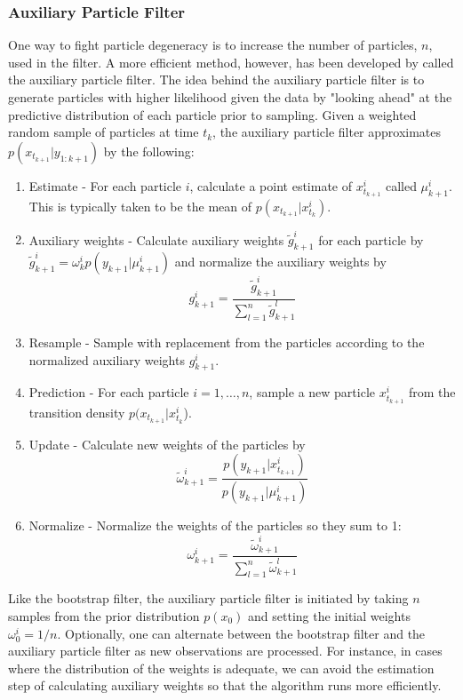 \documentclass{article}
\begin{document}
\subsubsection{Auxiliary Particle Filter}

One way to fight particle degeneracy is to increase the number of particles, $n$, used in the filter.  A more efficient method, however, has been developed by \citet{pitt} called the auxiliary particle filter.  The idea behind the auxiliary particle filter is to generate particles with higher likelihood given the data by "looking ahead" at the predictive distribution of each particle prior to sampling.  Given a weighted random sample of particles at time $t_k$, the auxiliary particle filter approximates $p(x_{t_{k+1}}|y_{1:k+1})$ by the following:

\begin{enumerate}
\item Estimate - For each particle $i$, calculate a point estimate of $x_{t_{k+1}}^i$ called $\mu_{k+1}^i$.  This is typically taken to be the mean of $p(x_{t_{k+1}}|x_{t_k}^i)$.
\item Auxiliary weights - Calculate auxiliary weights $\tilde{g}_{k+1}^i$ for each particle by $\tilde{g}_{k+1}^i = \omega_k^i p(y_{k+1}|\mu_{k+1}^i)$ and normalize the auxiliary weights by \[g_{k+1}^i = \frac{\tilde{g}_{k+1}^i}{\sum_{l=1}^n \tilde{g}_{k+1}^l}\]
\item Resample - Sample with replacement from the particles according to the normalized auxiliary weights $g_{k+1}^i$.
\item Prediction - For each particle $i = {1,\ldots,n}$, sample a new particle $x_{t_{k+1}}^i$ from the transition density $p(x_{t_{k+1}}|x_{t_k}^i$).
\item Update - Calculate new weights of the particles by \[\tilde{\omega}_{k+1}^i = \frac{p(y_{k+1}|x_{t_{k+1}}^i)}{p(y_{k+1}|\mu_{k+1}^i)}\]
\item Normalize - Normalize the weights of the particles so they sum to 1: \[\omega_{k+1}^i = \frac{\tilde{\omega}_{k+1}^i}{\sum_{l=1}^n \tilde{\omega}_{k+1}^l}\]
\end{enumerate}

\noindent Like the bootstrap filter, the auxiliary particle filter is initiated by taking $n$ samples from the prior distribution $p(x_0)$ and setting the initial weights $\omega_0^i = 1/n$.  Optionally, one can alternate between the bootstrap filter and the auxiliary particle filter as new observations are processed.  For instance, in cases where the distribution of the weights is adequate, we can avoid the estimation step of calculating auxiliary weights so that the algorithm runs more efficiently.
\end{document}
